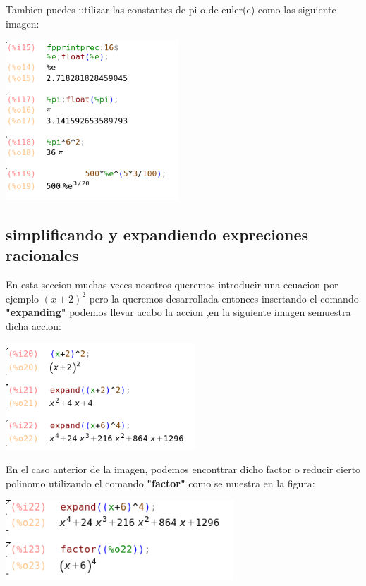 \documentclass{article}
\begin{document}
Tambien puedes utilizar las constantes de pi o de euler(e)
como las siguiente imagen:


\begin{center}
\includegraphics[height=6cm]{fto7.png}
\end{center}

\subsection{simplificando y expandiendo expreciones racionales}


En esta seccion muchas veces nosotros queremos introducir una ecuacion por ejemplo $(x+2)^2$ pero la queremos desarrollada entonces insertando el comando \textbf{"expanding"} podemos llevar acabo la accion ,en la siguiente imagen semuestra dicha accion:


\begin{center}
\includegraphics[height=4cm]{fto8.png}
\end{center}

En el caso anterior de la imagen, podemos enconttrar dicho factor o reducir cierto polinomo utilizando el comando \textbf{"factor"} como se muestra en la figura:

\begin{center}
\includegraphics[height=3cm]{fto9.png}
\end{center}
\end{document}
